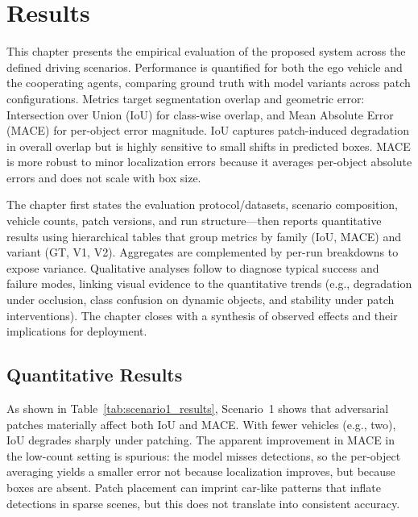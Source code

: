 \chapter{Results}
\label{results}

This chapter presents the empirical evaluation of the proposed system across the defined driving scenarios.
Performance is quantified for both the ego vehicle and the cooperating agents, comparing ground truth with model variants across patch configurations.
Metrics target segmentation overlap and geometric error: Intersection over Union (IoU) for class-wise overlap, and Mean Absolute Error (MACE) for per-object error magnitude.
IoU captures patch-induced degradation in overall overlap but is highly sensitive to small shifts in predicted boxes.
MACE is more robust to minor localization errors because it averages per-object absolute errors and does not scale with box size.

The chapter first states the evaluation protocol/datasets, scenario composition, vehicle counts, patch versions, and run structure—then reports quantitative results using hierarchical tables that group metrics by family (IoU, MACE) and variant (GT, V1, V2).
Aggregates are complemented by per-run breakdowns to expose variance. Qualitative analyses follow to diagnose typical success and failure modes, linking visual evidence to the quantitative trends (e.g., degradation under occlusion, class confusion on dynamic objects, and stability under patch interventions).
The chapter closes with a synthesis of observed effects and their implications for deployment.

\section{Quantitative Results}
\label{sec:quantitative_results}

As shown in Table~\ref{tab:scenario1_results}, Scenario~1 shows that adversarial patches materially affect both IoU and MACE.
With fewer vehicles (e.g., two), IoU degrades sharply under patching.
The apparent improvement in MACE in the low-count setting is spurious: the model misses detections, so the per-object averaging yields a smaller error not because localization improves, but because boxes are absent.
Patch placement can imprint car-like patterns that inflate detections in sparse scenes, but this does not translate into consistent accuracy.

